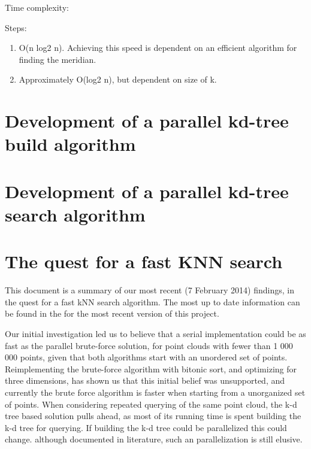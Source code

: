 Time complexity:

Steps:
\begin{enumerate}
    \item O(n log2 n). Achieving this speed is dependent on an efficient algorithm for finding the meridian.
    \item Approximately O(log2 n), but dependent on size of k.
\end{enumerate}


\section{Development of a parallel kd-tree build algorithm} %
\label{sub:development_of_a_parallel_kd_tree_build_algorithm}


\section{Development of a parallel kd-tree search algorithm} %
\label{sub:development_of_a_parallel_kd_tree_search_algorithm}

\section{The quest for a fast KNN search} %
\label{sec:the_quest_for_a_fast_KNN_search}

This document is a summary of our most recent (7 February 2014) findings, in the quest for a fast kNN search algorithm. The most up to date information can be found in the
for the most recent version of this project.

Our initial investigation led us to believe that a serial implementation could be as fast as the parallel brute-force solution, for point clouds with fewer than 1 000 000 points, given that both algorithms start with an unordered set of points. Reimplementing the brute-force algorithm with bitonic sort, and optimizing for three dimensions, has shown us that this initial belief was unsupported, and currently the brute force algorithm is faster when starting from a unorganized set of points. When considering repeated querying of the same point cloud, the k-d tree based solution pulls ahead, as most of its running time is spent building the k-d tree for querying. If building the k-d tree could be parallelized this could change. although documented in literature, such an parallelization is still elusive.

